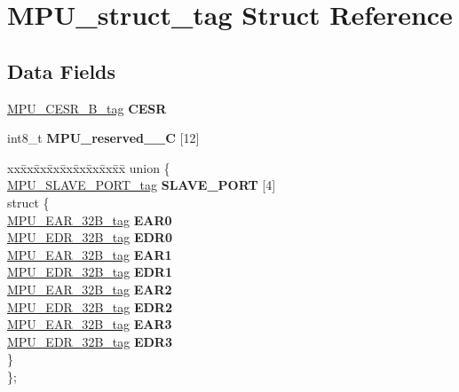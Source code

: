 \hypertarget{structMPU__struct__tag}{}\section{M\+P\+U\+\_\+struct\+\_\+tag Struct Reference}
\label{structMPU__struct__tag}
\subsection*{Data Fields}
\begin{DoxyCompactItemize}
\item 
\mbox{\label{structMPU__struct__tag_a4915d167c3a425a9a6893f290712fef4}} 
\mbox{\hyperlink{unionMPU__CESR__32B__tag}{M\+P\+U\+\_\+\+C\+E\+S\+R\+\_\+B\+\_\+tag}} {\bfseries C\+E\+SR}
\item 
\mbox{\label{structMPU__struct__tag_a2863286a6bfa76f6ee5bc4de84ca882a}} 
int8\+\_\+t {\bfseries M\+P\+U\+\_\+reserved\+\_\+\_\+C} \mbox{[}12\mbox{]}
\item 
\mbox{\label{structMPU__struct__tag_a2993ea40c397cdf67c91b5c2f848ef4d}} 
\begin{tabbing}
xx\=xx\=xx\=xx\=xx\=xx\=xx\=xx\=xx\=\kill
union \{\\
\>\mbox{\hyperlink{structMPU__SLAVE__PORT__struct__tag}{MPU\_SLAVE\_PORT\_tag}} {\bfseries SLAVE\_PORT} \mbox{[}4\mbox{]}\\
\mbox{\label{unionMPU__struct__tag_1_1_0D2157_a3289e6750b35aed88118c3b380fa0c73}} 
\>struct \{\\
\>\>\mbox{\hyperlink{unionMPU__EAR__32B__tag}{MPU\_EAR\_32B\_tag}} {\bfseries EAR0}\\
\>\>\mbox{\hyperlink{unionMPU__EDR__32B__tag}{MPU\_EDR\_32B\_tag}} {\bfseries EDR0}\\
\>\>\mbox{\hyperlink{unionMPU__EAR__32B__tag}{MPU\_EAR\_32B\_tag}} {\bfseries EAR1}\\
\>\>\mbox{\hyperlink{unionMPU__EDR__32B__tag}{MPU\_EDR\_32B\_tag}} {\bfseries EDR1}\\
\>\>\mbox{\hyperlink{unionMPU__EAR__32B__tag}{MPU\_EAR\_32B\_tag}} {\bfseries EAR2}\\
\>\>\mbox{\hyperlink{unionMPU__EDR__32B__tag}{MPU\_EDR\_32B\_tag}} {\bfseries EDR2}\\
\>\>\mbox{\hyperlink{unionMPU__EAR__32B__tag}{MPU\_EAR\_32B\_tag}} {\bfseries EAR3}\\
\>\>\mbox{\hyperlink{unionMPU__EDR__32B__tag}{MPU\_EDR\_32B\_tag}} {\bfseries EDR3}\\
\>\} \\
\}; \\


\end{tabbing}
\end{DoxyCompactItemize}
